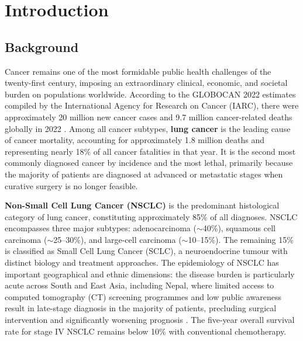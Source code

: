 \chapter{Introduction}

\section{Background}

Cancer remains one of the most formidable public health challenges of the
twenty-first century, imposing an extraordinary clinical, economic, and societal
burden on populations worldwide. According to the GLOBOCAN 2022 estimates compiled
by the International Agency for Research on Cancer (IARC), there were approximately
20 million new cancer cases and 9.7 million cancer-related deaths globally in 2022
\parencite{siegel2023cancer}. Among all cancer subtypes, \textbf{lung cancer} is
the leading cause of cancer mortality, accounting for approximately 1.8 million
deaths and representing nearly 18\% of all cancer fatalities in that year. It is
the second most commonly diagnosed cancer by incidence and the most lethal, primarily
because the majority of patients are diagnosed at advanced or metastatic stages when
curative surgery is no longer feasible.

\textbf{Non-Small Cell Lung Cancer (NSCLC)} is the predominant histological
category of lung cancer, constituting approximately 85\% of all diagnoses.
NSCLC encompasses three major subtypes: adenocarcinoma ($\sim$40\%), squamous cell
carcinoma ($\sim$25--30\%), and large-cell carcinoma ($\sim$10--15\%). The remaining
15\% is classified as Small Cell Lung Cancer (SCLC), a neuroendocrine tumour with
distinct biology and treatment approaches. The epidemiology of NSCLC has important
geographical and ethnic dimensions: the disease burden is particularly acute across
South and East Asia, including Nepal, where limited access to computed tomography
(CT) screening programmes and low public awareness result in late-stage diagnosis
in the majority of patients, precluding surgical intervention and significantly
worsening prognosis \parencite{rotow2023egfr}. The five-year overall survival rate
for stage IV NSCLC remains below 10\% with conventional chemotherapy.


